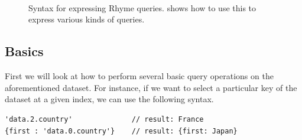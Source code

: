 \documentclass[runningheads]{llncs}
\newcommand{\lang}{Rhyme}
\begin{document}
\begin{figure}[t!]
\scriptsize
\begin{bnf*}
\\
 \\
 \\
 \\
 \\
 \\
 \\
 \\
\end{bnf*}
\vspace{-7mm}
\caption{Syntax for expressing \lang{} queries.  shows how to use this to express
various kinds of queries.}\label{fig:grammar}
\vspace{-5mm}
\end{figure}



\vspace{-4mm}
\subsection{Basics}
\vspace{-2mm}
First we will look at how to perform several basic query operations on the
aforementioned dataset.
For instance, if we want to select a particular key of the dataset at a given
index, we can use the following syntax.

\begin{lstlisting}[style=JavaScript]
'data.2.country'              // result: France
{first : 'data.0.country'}    // result: {first: Japan}
\end{lstlisting}
\end{document}
